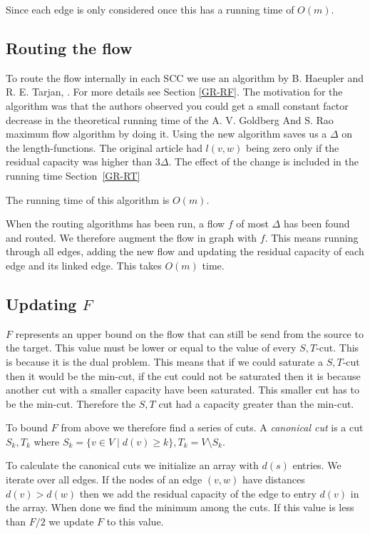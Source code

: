 Since each edge is only considered once this has a running time of $O(m)$.

\subsection{Routing the flow}
To route the flow internally in each SCC we use an algorithm by B. Haeupler and R. E. Tarjan, \cite{Haeupler2007}. For more details see Section 
\ref{GR-RF}. The motivation for the algorithm was that the authors observed you could get a small constant factor decrease in the theoretical
running time of the A. V. Goldberg And S. Rao maximum flow algorithm by doing it.
Using the new algorithm saves us a $\Delta$ on the length-functions. The original article had $l(v,w)$ being zero only if the residual
capacity was higher than $3\Delta$. The effect of the change is included in the running time Section~\ref{GR-RT}

The running time of this algorithm is $O(m)$.

When the routing algorithms has been run, a flow $f$ of most $\Delta$ has been found and routed. 
We therefore augment the flow in graph with $f$.
This means running through all edges, adding the new flow and updating the residual capacity of each edge and its linked edge.
This takes $O(m)$ time.

\subsection{Updating $F$} \label{GR-Parts-end}
$F$ represents an upper bound on the flow that can still be send from the source to the target. 
This value must be lower or equal to the value of every $S,T$-cut. This is because it is the dual problem. 
This means that if we could saturate a $S,T$-cut then it would be the min-cut, if the cut could not be saturated then it is because another cut with a
smaller capacity have been saturated. This smaller cut has to be the min-cut. Therefore the $S,T$ cut had a capacity greater than the min-cut.

To bound $F$ from above we therefore find a series of cuts. A \emph{canonical cut} is a cut $S_k,T_k$ where 
$S_k = \{v \in V \mid d(v) \geq k\}, T_k = V \setminus S_k$.

To calculate the canonical cuts we initialize an array with $d(s)$ entries. We iterate over all edges. If the nodes of an edge $(v,w)$
have distances $d(v) > d(w)$ then we add the residual capacity of the edge to entry $d(v)$ in the array. When done
we find the minimum among the cuts. If this value is less than $F/2$ we update $F$ to this value.

